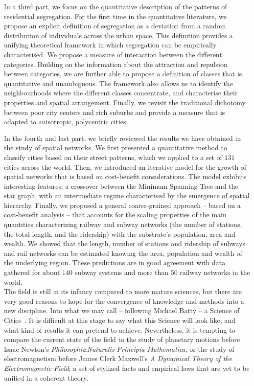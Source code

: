 In a third part, we focus on the quantitative description of the patterns of
residential segregation. For the first time in the quantitative literature, we
propose an explicit definition of segregation as a deviation from a random
distribution of individuals across the urban space. This definition provides a
unifying theoretical framework in which segregation can be empirically
characterised. We propose a measure of interaction between the different
categories. Building on the information about the attraction and repulsion
between categories, we are further able to propose a definition of classes that
is quantitative and unambiguous. The framework also allows us to identify the
neighbourhoods where the different classes concentrate, and characterise their
properties and spatial arrangement. Finally, we revisit the traditional
dichotomy between poor city centers and rich suburbs and provide a measure that
is adapted to anisotropic, polycentric cities. 

In the fourth and last part, we briefly reviewed the results we have obtained in
the study of spatial networks. We first presented a quantitative method to
classify cities based on their street patterns, which we applied to a set of
$131$ cities across the world. Then, we introduced an iterative model for the
growth of spatial networks that is based on cost-benefit considerations. The
model exhibits interesting features: a crossover between the Minimum Spanning
Tree and the star graph, with an intermediate regime characterised by the
emergence of spatial hierarchy. Finally, we proposed a general coarse-grained
approach -- based on a
cost-benefit analysis -- that accounts for the scaling properties of the main
quantities characterizing railway and subway networks (the number of stations, the total
length, and the ridership) with the substrate's population, area and wealth.
We showed that the length, number of stations and ridership of
subways and rail networks can be estimated knowing the area, population and
wealth of the underlying region. These predictions are in good agreement with
data gathered for about $140$ subway systems and more than $50$ railway networks in the
world.\\ 

The field is still in its infancy compared to more mature sciences, but there
are very good reasons to hope for the convergence of knowledge and methods into
a new discipline. Into what we may call -- following Michael Batty -- a Science of
Cities~\cite{Batty:2012,Batty:2013}. It is difficult at this stage to say what this Science will look like,
and what kind of results it can pretend to achieve. Nevertheless, it is tempting to
compare the current state of the field to the study of planetary motions
before Isaac Newton's \emph{Philosophi\ae  Naturalis Principia Mathematica}, or
the study of electromagnetism before James Clerk Maxwell's \emph{A Dynamical
Theory of the Electromagnetic Field}; a set of stylized facts and empirical laws
that are yet to be unified in a coherent theory. 


